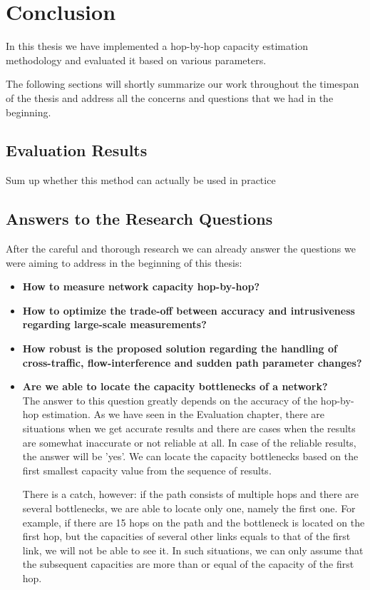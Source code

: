 \chapter{Conclusion}
In this thesis we have implemented a hop-by-hop capacity estimation methodology and evaluated it based on various parameters. 

The following sections will shortly summarize our work throughout the timespan of the thesis and address all the concerns and questions that we had in the beginning.

\section{Evaluation Results}
Sum up whether this method can actually be used in practice\\

\section{Answers to the Research Questions}
After the careful and thorough research we can already answer the questions we were aiming to address in the beginning of this thesis: \\
\begin{itemize}
  \item \textbf{How to measure network capacity hop-by-hop?}
  \\ 
  \item \textbf{How to optimize the trade-off between accuracy and intrusiveness regarding large-scale measurements?}
  \\
  \item \textbf{How robust is the proposed solution regarding the handling of cross-traffic, flow-interference and sudden path parameter changes?}
  \\
  \item \textbf{Are we able to locate the capacity bottlenecks of a network?}
  \\ The answer to this question greatly depends on the accuracy of the hop-by-hop estimation. As we have seen in the Evaluation chapter, there are situations when we get accurate results and there are cases when the results are somewhat inaccurate or not reliable at all. In case of the reliable results, the answer will be 'yes'. We can locate the capacity bottlenecks based on the first smallest capacity value from the sequence of results. 
  
  There is a catch, however: if the path consists of multiple hops and there are several bottlenecks, we are able to locate only one, namely the first one. For example, if there are 15 hops on the path and the bottleneck is located on the first hop, but the capacities of several other links equals to that of the first link, we will not be able to see it. In such situations, we can only assume that the subsequent capacities are more than or equal of the capacity of the first hop.
\end{itemize}

